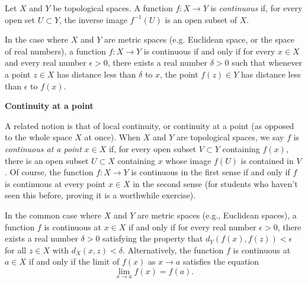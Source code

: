 \documentclass[12pt]{article}
\begin{document}
Let $X$ and $Y$ be topological spaces. A function $f\colon X \to Y$ is {\em continuous} if, for every open set $U \subset Y$, the inverse image $f^{-1}(U)$ is an open subset of $X$.

In the case where $X$ and $Y$ are metric spaces (e.g. Euclidean space, or the space of real numbers), a function $f\colon X \to Y$ is continuous if and only if for every $x \in X$ and every real number $\epsilon > 0$, there exists a real number $\delta > 0$ such that whenever a point $z \in X$ has distance less than $\delta$ to $x$, the point $f(z) \in Y$ has distance less than $\epsilon$ to $f(x)$.

{\bf Continuity at a point}

A related notion is that of local continuity, or continuity at a point (as opposed  to the whole space $X$ at once). When $X$ and $Y$ are topological spaces, we say $f$ is {\em continuous at a point} $x \in X$ if, for every open subset $V \subset Y$ containing $f(x)$, there is an open subset $U \subset X$ containing $x$ whose image $f(U)$ is contained in $V$. Of course, the function $f\colon X \to Y$ is continuous in the first sense if and only if $f$ is continuous at every point $x \in X$ in the second sense (for students who haven't seen this before, proving it is a worthwhile exercise).

In the common case where $X$ and $Y$ are metric spaces (e.g., Euclidean spaces), a function $f$ is continuous at $x \in X$ if and only if for every real number $\epsilon > 0$, there exists a real number $\delta > 0$ satisfying the property that $d_Y(f(x),f(z)) < \epsilon$ for all $z \in X$ with $d_X(x,z) < \delta$.
Alternatively, the function $f$ is continuous at $a \in X$ if and only if the limit of $f(x)$ as $x \to a$ satisfies the equation
$$
\lim_{x \to a} f(x) = f(a).
$$
\end{document}
